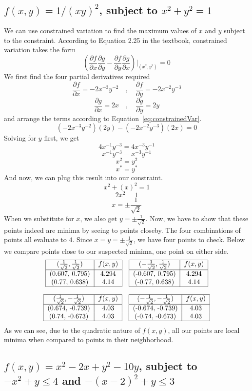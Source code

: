 \documentclass[11pt]{scrartcl}
\begin{document}
\subsection{$f(x,y) = 1/(xy)^2$, subject to $x^2 + y^2 = 1$}
We can use constrained variation to find the maximum values of $x$ and $y$
subject to the constraint.
According to Equation 2.25 in the textbook, constrained variation takes the 
form 
\begin{equation}
	\label{eq:constrainedVar}
	(\frac{\partial f}{\partial x}\frac{\partial g}{\partial y} - \frac{\partial f}{\partial y}\frac{\partial g}{\partial x})|_{(x^{*},y^{*})} = 0
\end{equation}
We first find the four partial derivatives required
\[\frac{\partial f}{\partial x} = -2x^{-3}y^{-2}\quad,\quad\frac{\partial f}{\partial y} = -2x^{-2}y^{-3}\]
\[\frac{\partial g}{\partial x} = 2x\quad,\quad\frac{\partial g}{\partial y} = 2y\]
and arrange the terms according to Equation~\ref{eq:constrainedVar}.
\[(-2x^{-3}y^{-2})(2y) - (-2x^{-2}y^{-3})(2x) = 0\]
Solving for $y$ first, we get
\[ 4x^{-1}y^{-3} = 4x^{-3}y^{-1} \]
\[ x^{-1}y^{-3} = x^{-3}y^{-1} \]
\[ x^2 = y^2 \]
\[ x^{*} = y^{*}\]
And now, we can plug this result into our constraint.
\[x^2 + (x)^2 = 1\]
\[2x^2 = 1\]
\[x = \pm\frac{1}{\sqrt{2}}\]
When we substitute for $x$, we also get $y=\pm\frac{1}{\sqrt{2}}$.
Now, we have to show that these points indeed are minima by seeing to points 
closeby.
The four combinations of points all evaluate to $4$.
Since $x = y = \pm\frac{1}{\sqrt{2}}$, we have four points to check.
Below we compare points close to our suspected minima, one point on either side.
\[
\begin{tabular}{|c| c|}
		\hline
		$(\frac{1}{\sqrt{2}}, \frac{1}{\sqrt{2}})$ & $f(x,y)$\\
		\hline
		(0.607, 0.795) & 4.294\\
		(0.77, 0.638) & 4.14\\
		\hline
\end{tabular}
\quad
\begin{tabular}{|c| c|}
		\hline
		$(-\frac{1}{\sqrt{2}}, \frac{1}{\sqrt{2}})$ & $f(x,y)$\\
		\hline
		(-0.607, 0.795) & 4.294\\
		(-0.77, 0.638) & 4.14\\
		\hline
\end{tabular}
\]

\[
\begin{tabular}{|c| c|}
		\hline
		$(\frac{1}{\sqrt{2}}, -\frac{1}{\sqrt{2}})$ & $f(x,y)$\\
		\hline
		(0.674, -0.739) & 4.03 \\
		(0.74, -0.673) & 4.03\\
		\hline
\end{tabular}
\quad
\begin{tabular}{|c| c|}
		\hline
		$(-\frac{1}{\sqrt{2}}, -\frac{1}{\sqrt{2}})$ & $f(x,y)$\\
		\hline
		(-0.674, -0.739) & 4.03 \\
		(-0.74, -0.673) & 4.03\\
		\hline
\end{tabular}
\]
As we can see, due to the quadratic nature of $f(x,y)$, all our
points are local minima when compared to points in their 
neighborhood.
\subsection{$f(x,y) = x^2 - 2x + y^2- 10y$, 
subject to $-x^2 + y \leq 4$ and $-(x-2)^2 + y \leq 3$}
\end{document}
